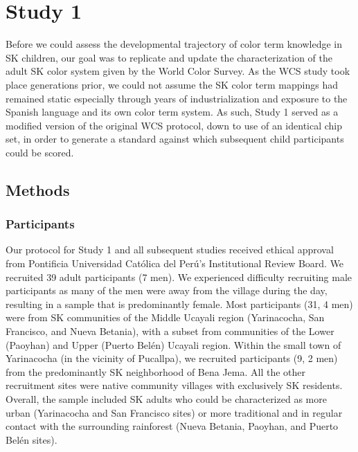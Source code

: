 \documentclass[
  english,
  ,man,floatsintext]{apa6}
\begin{document}
\hypertarget{study-1}{%
\section{Study 1}\label{study-1}}

Before we could assess the developmental trajectory of color term knowledge in SK children, our goal was to replicate and update the characterization of the adult SK color system given by the World Color Survey. As the WCS study took place generations prior, we could not assume the SK color term mappings had remained static especially through years of industrialization and exposure to the Spanish language and its own color term system. As such, Study 1 served as a modified version of the original WCS protocol, down to use of an identical chip set, in order to generate a standard against which subsequent child participants could be scored.

\hypertarget{methods}{%
\subsection{Methods}\label{methods}}

\hypertarget{participants}{%
\subsubsection{Participants}\label{participants}}

Our protocol for Study 1 and all subsequent studies received ethical approval from Pontificia Universidad Católica del Perú's Institutional Review Board. We recruited 39 adult participants (7 men). We experienced difficulty recruiting male participants as many of the men were away from the village during the day, resulting in a sample that is predominantly female. Most participants (31, 4 men) were from SK communities of the Middle Ucayali region (Yarinacocha, San Francisco, and Nueva Betania), with a subset from communities of the Lower (Paoyhan) and Upper (Puerto Belén) Ucayali region. Within the small town of Yarinacocha (in the vicinity of Pucallpa), we recruited participants (9, 2 men) from the predominantly SK neighborhood of Bena Jema. All the other recruitment sites were native community villages with exclusively SK residents. Overall, the sample included SK adults who could be characterized as more urban (Yarinacocha and San Francisco sites) or more traditional and in regular contact with the surrounding rainforest (Nueva Betania, Paoyhan, and Puerto Belén sites).
\end{document}
